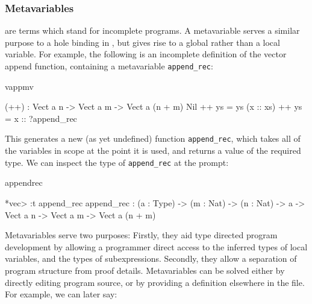
\subsubsection{Metavariables}

 are terms which stand for incomplete programs. A
metavariable serves a similar
purpose to a hole binding in \TT{}, but gives rise to a global rather than a
local variable. For example, the following is an incomplete definition of
the vector append function, containing a metavariable \texttt{append\_rec}:

\begin{SaveVerbatim}{vappmv}

(++) : Vect a n -> Vect a m -> Vect a (n + m)
Nil       ++ ys = ys
(x :: xs) ++ ys = x :: ?append_rec

\end{SaveVerbatim}

This generates a new (as yet undefined)
function \texttt{append\_rec}, which takes all of the variables
in scope at the point it is used, and returns a value of the required type.
We can inspect the type of \texttt{append\_rec} at the \Idris{} prompt:

\begin{SaveVerbatim}{appendrec}

*vec> :t append_rec
append_rec : (a : Type) -> (m : Nat) -> (n : Nat) -> a -> 
             Vect a n -> Vect a m -> Vect a (n + m)

\end{SaveVerbatim}

Metavariables serve two purposes: Firstly, they aid type directed program development
by allowing a programmer direct access to the inferred types of local variables, and
the types of subexpressions. Secondly, they allow a separation of program structure
from proof details. Metavariables can be solved either by directly editing program
source, or by providing a definition elsewhere in the file. For example, we can later say:

